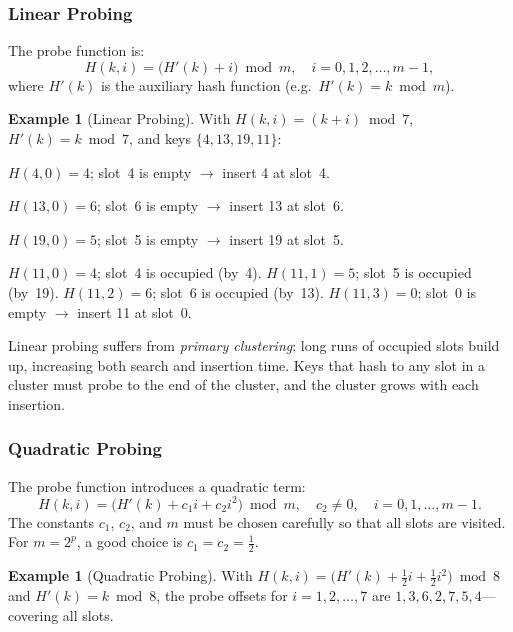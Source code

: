 \documentclass[11pt, a4paper, notitlepage]{report}
\theoremstyle{definition}
\theoremstyle{remark}
\theoremstyle{definition}
\newtheorem{example}[theorem]{Example}
\begin{document}
\subsubsection{Linear Probing}
\label{subsubsec:linear-probing}

The probe function is:
\[
  H(k, i) = \bigl(H'(k) + i\bigr) \bmod m, \quad i = 0, 1, 2, \ldots, m-1,
\]
where $H'(k)$ is the auxiliary hash function (e.g.\ $H'(k) = k \bmod m$).

\begin{example}[Linear Probing]
\label{ex:linear-probing}
With $H(k,i) = (k + i) \bmod 7$, $H'(k) = k \bmod 7$, and
keys $\{4, 13, 19, 11\}$:

$H(4,0) = 4$; slot~4 is empty $\to$ insert 4 at slot~4.

$H(13,0) = 6$; slot~6 is empty $\to$ insert 13 at slot~6.

$H(19,0) = 5$; slot~5 is empty $\to$ insert 19 at slot~5.

$H(11,0) = 4$; slot~4 is occupied (by~4).
$H(11,1) = 5$; slot~5 is occupied (by~19).
$H(11,2) = 6$; slot~6 is occupied (by~13).
$H(11,3) = 0$; slot~0 is empty $\to$ insert 11 at slot~0.
\end{example}

\begin{warning}[title={Primary Clustering}]
Linear probing suffers from \emph{primary clustering}: long runs of occupied
slots build up, increasing both search and insertion time.  Keys that hash
to any slot in a cluster must probe to the end of the cluster, and the
cluster grows with each insertion.
\end{warning}

\subsubsection{Quadratic Probing}
\label{subsubsec:quadratic-probing}

The probe function introduces a quadratic term:
\[
  H(k, i) = \bigl(H'(k) + c_1 i + c_2 i^2\bigr) \bmod m,
  \quad c_2 \neq 0, \quad i = 0, 1, \ldots, m-1.
\]
The constants $c_1$, $c_2$, and $m$ must be chosen carefully so that all
slots are visited.  For $m = 2^p$, a good choice is $c_1 = c_2 = \tfrac{1}{2}$.

\begin{example}[Quadratic Probing]
\label{ex:quadratic-probing}
With $H(k,i) = \bigl(H'(k) + \tfrac{1}{2}i + \tfrac{1}{2}i^2\bigr) \bmod 8$
and $H'(k) = k \bmod 8$, the probe offsets for $i = 1, 2, \ldots, 7$ are
$1, 3, 6, 2, 7, 5, 4$---covering all slots.
\end{example}
\end{document}
